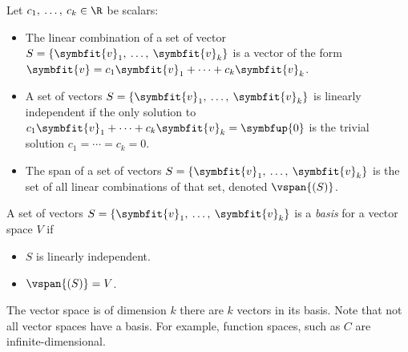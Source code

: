 \documentclass{article}
\begin{document}
Let \(c_1,\: \dots,\: c_k \in \R\) be scalars:
\begin{itemize}
    \item The linear combination of a set of vector \(S = \left\{ \symbfit{v}_1,\: \dots,\: \symbfit{v}_k \right\}\)
          is a vector of the form \(\symbfit{v} = c_1 \symbfit{v}_1 + \cdots + c_k \symbfit{v}_k\).
    \item A set of vectors \(S = \left\{ \symbfit{v}_1,\: \dots,\: \symbfit{v}_k \right\}\) is linearly independent if
          the only solution to \(c_1 \symbfit{v}_1 + \cdots + c_k \symbfit{v}_k = \symbfup{0}\) is the trivial solution \(c_1 = \cdots = c_k = 0\).
    \item The span of a set of vectors \(S = \left\{ \symbfit{v}_1,\: \dots,\: \symbfit{v}_k \right\}\) is the set of all linear combinations of
          that set, denoted \(\vspan{\left( S \right)}\).
\end{itemize}
A set of vectors \(S = \left\{ \symbfit{v}_1,\: \dots,\: \symbfit{v}_k \right\}\) is a \textit{basis} for a vector space \(V\) if
\begin{itemize}
    \item \(S\) is linearly independent.
    \item \(\vspan{\left( S \right)} = V\).
\end{itemize}
The vector space is of dimension \(k\) there are \(k\) vectors in its basis. Note that not all vector spaces have a basis. For example, function spaces, such as \(C\)
are infinite-dimensional.
\end{document}
